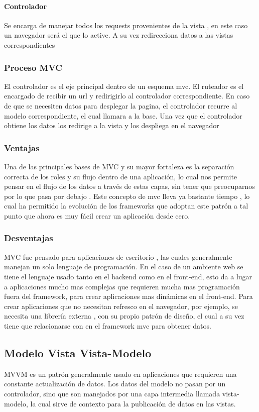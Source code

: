 \paragraph{Controlador} Se encarga de manejar todos los requests
provenientes de la vista , en este caso un navegador será el que lo active. A
su vez redirecciona datos a las vistas correspondientes

\subsubsection{Proceso MVC}
El controlador es el eje principal dentro de un esquema mvc. El ruteador es el
encargado de recibir un url y redirigirlo al controlador correspondiente. En
caso de que se necesiten datos para desplegar la pagina, el controlador recurre
al modelo correspondiente, el cual llamara a la base. Una vez que el
controlador obtiene los datos los redirige a la vista y los despliega en el
navegador

\subsubsection{Ventajas}
Una de las principales bases de MVC y su mayor fortaleza es la separación
correcta de los roles y su flujo dentro de una aplicación, lo cual nos permite
pensar en el flujo de los datos a través de estas capas, sin tener que
preocuparnos por lo que pasa por debajo . Este concepto de mvc lleva ya
bastante tiempo , lo cual ha permitido la evolución de los frameworks que
adoptan este patrón a tal punto que ahora es muy fácil crear un aplicación
desde cero.

\subsubsection{Desventajas}
MVC fue pensado para aplicaciones de escritorio , las cuales generalmente
manejan un solo lenguaje de programación. En el caso de un ambiente web se
tiene el lenguaje usado tanto en el backend como en el front-end, esto da a
lugar a aplicaciones mucho mas complejas que requieren mucha mas programación
fuera del framework, para crear aplicaciones mas dinámicas en el front-end.
Para crear aplicaciones que no necesitan refresco en el navegador, por ejemplo,
se necesita una librería externa , con su propio patrón de diseño, el cual a su
vez tiene que relacionarse con en el framework mvc para obtener datos.

\subsection{Modelo Vista Vista-Modelo}
MVVM es un patrón generalmente usado en aplicaciones que requieren una
constante actualización de datos. Los datos del modelo no pasan por un
controlador, sino que son manejados por una capa intermedia llamada
vista-modelo, la cual sirve de contexto para la publicación de datos
en las vistas.

